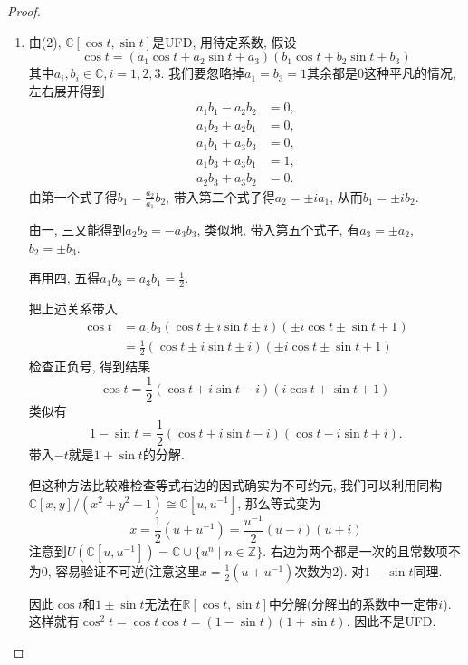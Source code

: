 \begin{proof}
\begin{enumerate}[(1)]
        \item 由(2), $\mathbb{C}[\cos t, \sin t]$是UFD, 用待定系数, 假设
        \[
            \cos t = (a_1\cos t + a_2\sin t + a_3)(b_1\cos t + b_2\sin t + b_3)
        \]
        其中$a_i, b_i \in \mathbb{C}, i = 1, 2, 3$. 我们要忽略掉$a_1 = b_3 = 1$其余都是$0$这种平凡的情况, 左右展开得到
        \[
        \begin{aligned}
            a_1b_1 - a_2b_2 &= 0,\\
            a_1b_2 + a_2b_1 &= 0,\\
            a_1b_1 + a_3b_3 &= 0,\\
            a_1b_3 + a_3b_1 &= 1,\\
            a_2b_3 + a_3b_2 &= 0.
        \end{aligned}
        \]
        由第一个式子得$b_1 = \frac{a_2}{a_1}b_2$, 带入第二个式子得$a_2 = \pm ia_1$, 从而$b_1 = \pm ib_2$.
        
        由一, 三又能得到$a_2b_2 = -a_3b_3$, 类似地, 带入第五个式子, 有$a_3 = \pm a_2$, $b_2 = \pm b_3$.
        
        再用四, 五得$a_1b_3 = a_3b_1 = \frac{1}{2}$.
        
        把上述关系带入
        \[
        \begin{aligned}
            \cos t &= a_1b_3(\cos t \pm i\sin t \pm i)(\pm i\cos t \pm \sin t + 1)\\
            &= \frac{1}{2}(\cos t \pm i\sin t \pm i)(\pm i\cos t \pm \sin t + 1)
        \end{aligned}
        \]
        检查正负号, 得到结果
        \[
            \cos t = \frac{1}{2}(\cos t + i\sin t - i)(i\cos t + \sin t + 1)\, 
        \]
        类似有
        \[
            1 - \sin t = \frac{1}{2}(\cos t + i\sin t - i)(\cos t - i\sin t + i).
        \]
        带入$-t$就是$1 + \sin t$的分解.
        
        但这种方法比较难检查等式右边的因式确实为不可约元, 我们可以利用同构$\mathbb{C}[x, y]/(x^2 + y^2 - 1) \cong \mathbb{C}[u, u^{-1}]$, 那么等式变为
        \[
            x = \frac{1}{2}(u + u^{-1}) = \frac{u^{-1}}{2}(u - i)(u + i)
        \]
        注意到$U(\mathbb{C}[u, u^{-1}]) = \mathbb{C} \cup \{u^n \mid n \in \mathbb{Z}\}$. 右边为两个都是一次的且常数项不为$0$, 容易验证不可逆(注意这里$x = \frac{1}{2}(u + u^{-1})$次数为$2$). 对$1 - \sin t$同理.
        
        因此$\cos t$和$1 \pm \sin t$无法在$\mathbb{R}[\cos t, \sin t]$中分解(分解出的系数中一定带$i$). 这样就有$\cos^2 t = \cos t\cos t = (1 - \sin t)(1 + \sin t)$. 因此不是UFD.
    \end{enumerate}
\end{proof}

